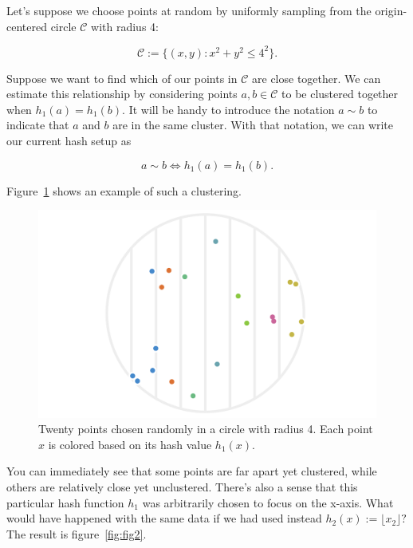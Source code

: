 \documentclass[20pt,]{extarticle}
\begin{document}
Let's suppose we choose points at random by uniformly sampling from the
origin-centered circle \(\mathcal C\) with radius 4:

\[ \mathcal C := \{ (x, y) : x^2 + y^2 \le 4^2 \}. \]

Suppose we want to find which of our points in \(\mathcal C\) are close
together. We can estimate this relationship by considering points
\(a, b \in \mathcal C\) to be clustered together when
\(h_1(a) = h_1(b).\) It will be handy to introduce the notation
\(a \sim b\) to indicate that \(a\) and \(b\) are in the same cluster.
With that notation, we can write our current hash setup as

\[ a \sim b \iff h_1(a) = h_1(b). \]

Figure~\ref{fig:fig1} shows an example of such a clustering.

\begin{figure}
\centering
\includegraphics{images/lsh_image1_v2.png}
\caption{Twenty points chosen randomly in a circle with radius 4. Each
point \(x\) is colored based on its hash value
\(h_1(x).\)}\label{fig:fig1}
\end{figure}

You can immediately see that some points are far apart yet clustered,
while others are relatively close yet unclustered. There's also a sense
that this particular hash function \(h_1\) was arbitrarily chosen to
focus on the x-axis. What would have happened with the same data if we
had used instead \(h_2(x) := \lfloor x_2 \rfloor?\) The result is
figure~\ref{fig:fig2}.
\end{document}
